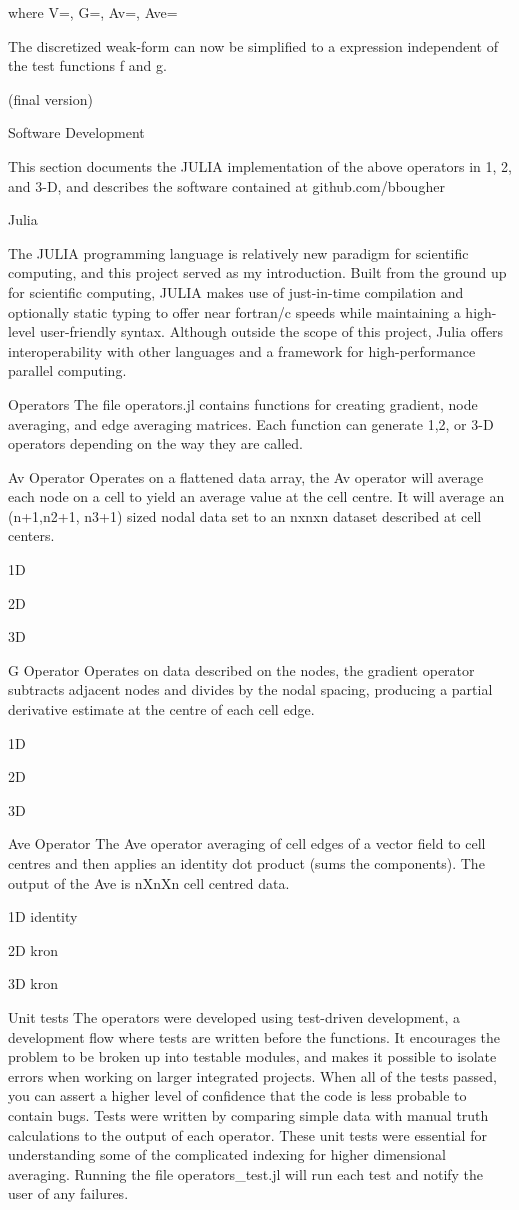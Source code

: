 where V=, G=, Av=, Ave=

The discretized weak-form can now be simplified to a expression independent of the test functions f and g.

(final version)


Software Development

This section documents the JULIA implementation of the above operators in 1, 2, and 3-D, and describes the software contained at github.com/bbougher

	Julia
	
The JULIA programming language is relatively new paradigm for scientific computing, and this project served as my introduction. Built from the ground up for scientific computing, JULIA makes use of just-in-time compilation and optionally static typing to offer near fortran/c speeds while maintaining a high-level user-friendly syntax. Although outside the scope of this project, Julia offers interoperability with other languages and a framework for high-performance parallel computing.
	
	Operators
The file operators.jl contains functions for creating gradient, node averaging, and edge averaging matrices. Each function can generate 1,2, or 3-D operators depending on the way they are called. 

Av Operator
Operates on a flattened data array, the Av operator will average each node on a cell to yield an average value at the cell centre. It will average an (n+1,n2+1, n3+1) sized nodal data set to an nxnxn dataset described at cell centers.

1D

2D

3D

G Operator
Operates on data described on the nodes, the gradient operator subtracts adjacent nodes and divides by the nodal spacing, producing a partial derivative estimate at the centre of each cell edge. 

1D

2D

3D

Ave Operator
The Ave operator averaging of cell edges of a vector field to cell centres and then applies an identity dot product (sums the components). The output of the Ave is nXnXn cell centred data.

1D
identity

2D
kron

3D
kron
	

	Unit tests
The operators were developed using test-driven development, a development flow where tests are written before the functions. It encourages the problem to be broken up into testable modules, and makes it possible to isolate errors when working on larger integrated projects. When all of the tests passed, you can assert a higher level of confidence that the code is less probable to contain bugs. Tests were written by comparing simple data with manual truth calculations to the output of each operator. These unit tests were essential for understanding some of the complicated indexing for higher dimensional averaging. Running the file operators_test.jl will run each test and notify the user of any failures.
	

